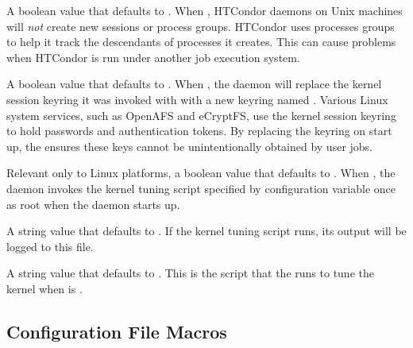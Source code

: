 \begin{description}
\label{param:UseProcessGroups} 
\item[\Macro{USE\_PROCESS\_GROUPS}]
  A boolean value that defaults to .  When ,
  HTCondor daemons on Unix machines will \emph{not} create new sessions
  or process groups. HTCondor uses processes groups to help it track the
  descendants of processes it creates. This can cause problems when
  HTCondor is run under another job execution system.

\label{param:DiscardSessionKeyringOnStartup} 
\item[\Macro{DISCARD\_SESSION\_KEYRING\_ON\_STARTUP}]
  A boolean value that defaults to .  When ,
  the  daemon will replace the kernel session keyring
  it was invoked with with a new keyring named .  
  Various Linux system services, such as OpenAFS and eCryptFS, 
  use the kernel session keyring to hold passwords and authentication tokens.
  By replacing the keyring on start up, the  ensures
  these keys cannot be unintentionally obtained by user jobs. 

\item[\Macro{ENABLE\_KERNEL\_TUNING}]
  Relevant only to Linux platforms, a boolean value that defaults 
  to .
  When ,
  the  daemon invokes the kernel tuning script 
  specified by configuration variable 
  once as root when the  daemon starts up.

\item[\Macro{KERNEL\_TUNING\_LOG}]
  A string value that defaults to .  
  If the kernel tuning script runs, its output will be logged to this file.

\item[\Macro{LINUX\_KERNEL\_TUNING\_SCRIPT}]
  A string value that defaults to .
  This is the script that the  runs to tune the
  kernel when  is .

\end{description}

\subsection{\label{sec:Startd-Config-File-Entries}
Configuration File Macros}

